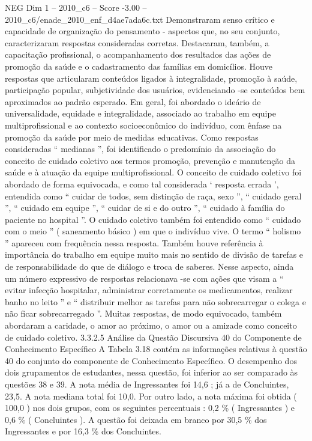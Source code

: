 \begin{textsample}{NEG Dim 1 – 2010\_c6 – Score -3.00 – 2010\_c6/enade\_2010\_enf\_d4ae7ada6c.txt}
Demonstraram senso crítico e capacidade de organização do pensamento - aspectos que, no seu conjunto, caracterizaram respostas consideradas corretas.
Destacaram, também, a capacitação profissional, o acompanhamento dos resultados das ações de promoção da saúde e o cadastramento das famílias em domicílios.
Houve respostas que articularam conteúdos ligados à integralidade, promoção à saúde, participação popular, subjetividade dos usuários, evidenciando -se conteúdos bem aproximados ao padrão esperado.
Em geral, foi abordado o ideário de universalidade, equidade e integralidade, associado ao trabalho em equipe multiprofissional e ao contexto socioeconômico do indivíduo, com ênfase na promoção da saúde por meio de medidas educativas.
Como respostas consideradas “ medianas ”, foi identificado o predomínio da associação do conceito de cuidado coletivo aos termos promoção, prevenção e manutenção da saúde e à atuação da equipe multiprofissional.
O conceito de cuidado coletivo foi abordado de forma equivocada, e como tal considerada ‘ resposta errada ’, entendida como “ cuidar de todos, sem distinção de raça, sexo ”, “ cuidado geral ”, “ cuidado em equipe ”, “ cuidar de si e do outro ”, “ cuidado à família do paciente no hospital ”.
O cuidado coletivo também foi entendido como “ cuidado com o meio ” ( saneamento básico ) em que o indivíduo vive.
O termo “ holismo ” apareceu com frequência nessa resposta.
Também houve referência à importância do trabalho em equipe muito mais no sentido de divisão de tarefas e de responsabilidade do que de diálogo e troca de saberes.
Nesse aspecto, ainda um número expressivo de respostas relacionava -se com ações que visam a “ evitar infecção hospitalar, administrar corretamente os medicamentos, realizar banho no leito ” e “ distribuir melhor as tarefas para não sobrecarregar o colega e não ficar sobrecarregado ”.
Muitas respostas, de modo equivocado, também abordaram a caridade, o amor ao próximo, o amor ou a amizade como conceito de cuidado coletivo. 3.3.2.5 Análise da Questão Discursiva 40 do Componente de Conhecimento Específico A Tabela 3.18 contém as informações relativas à questão 40 do conjunto do componente de Conhecimento Específico.
O desempenho dos dois grupamentos de estudantes, nessa questão, foi inferior ao ser comparado às questões 38 e 39.
A nota média de Ingressantes foi 14,6 ; já a de Concluintes, 23,5.
A nota mediana total foi 10,0.
Por outro lado, a nota máxima foi obtida ( 100,0 ) nos dois grupos, com os seguintes percentuais : 0,2 \% ( Ingressantes ) e 0,6 \% ( Concluintes ).
A questão foi deixada em branco por 30,5 \% dos Ingressantes e por 16,3 \% dos Concluintes.

\end{textsample}
